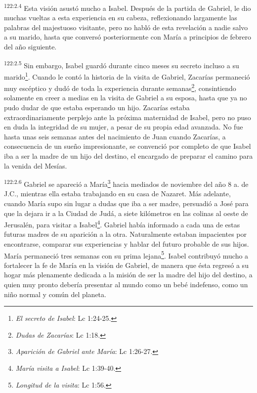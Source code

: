 \par 
\textsuperscript{122:2.4} Esta visión asustó mucho a Isabel. Después de la partida de Gabriel, le dio muchas vueltas a esta experiencia en su cabeza, reflexionando largamente las palabras del majestuoso visitante, pero no habló de esta revelación a nadie salvo a su marido, hasta que conversó posteriormente con María a principios de febrero del año siguiente.

\par 
\textsuperscript{122:2.5} Sin embargo, Isabel guardó durante cinco meses su secreto incluso a su marido\footnote{\textit{El secreto de Isabel}: Lc 1:24-25.}. Cuando le contó la historia de la visita de Gabriel, Zacarías permaneció muy escéptico y dudó de toda la experiencia durante semanas\footnote{\textit{Dudas de Zacarías}: Lc 1:18.}, consintiendo solamente en creer a medias en la visita de Gabriel a su esposa, hasta que ya no pudo dudar de que estaba esperando un hijo. Zacarías estaba extraordinariamente perplejo ante la próxima maternidad de Isabel, pero no puso en duda la integridad de su mujer, a pesar de su propia edad avanzada. No fue hasta unas seis semanas antes del nacimiento de Juan cuando Zacarías, a consecuencia de un sueño impresionante, se convenció por completo de que Isabel iba a ser la madre de un hijo del destino, el encargado de preparar el camino para la venida del Mesías.

\par 
\textsuperscript{122:2.6} Gabriel se apareció a María\footnote{\textit{Aparición de Gabriel ante María}: Lc 1:26-27.} hacia mediados de noviembre del año 8 a. de J.C., mientras ella estaba trabajando en su casa de Nazaret. Más adelante, cuando María supo sin lugar a dudas que iba a ser madre, persuadió a José para que la dejara ir a la Ciudad de Judá, a siete kilómetros en las colinas al oeste de Jerusalén, para visitar a Isabel\footnote{\textit{María visita a Isabel}: Lc 1:39-40.}. Gabriel había informado a cada una de estas futuras madres de su aparición a la otra. Naturalmente estaban impacientes por encontrarse, comparar sus experiencias y hablar del futuro probable de sus hijos. María permaneció tres semanas con su prima lejana\footnote{\textit{Longitud de la visita}: Lc 1:56.}. Isabel contribuyó mucho a fortalecer la fe de María en la visión de Gabriel, de manera que ésta regresó a su hogar más plenamente dedicada a la misión de ser la madre del hijo del destino, a quien muy pronto debería presentar al mundo como un bebé indefenso, como un niño normal y común del planeta.

